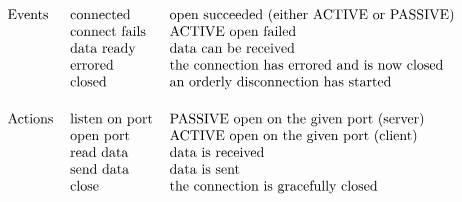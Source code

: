 
\[\begin{tabular}{llp{3.0in}}
Events&	connected&	open succeeded (either ACTIVE or PASSIVE)\\
&	connect fails&	ACTIVE open failed\\
&	data ready&	data can be received\\
&	errored&	the connection has errored and is now closed\\
&	closed&		an orderly disconnection has started\\[0.2in]
Actions&listen on port&	PASSIVE open on the given port (server)\\
&	open port&	ACTIVE open on the given port (client)\\
&	read data&	data is received\\
&	send data&	data is sent\\
&	close&		the connection is gracefully closed
\end{tabular}\]
